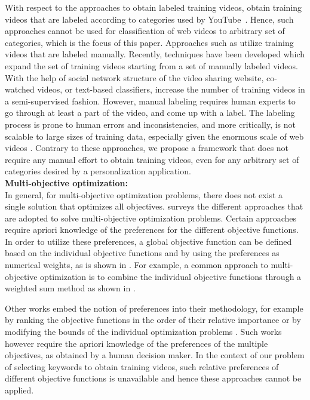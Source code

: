 With respect to the approaches to obtain labeled training videos, \cite{chen2010web,wu2010data,ramachandran2009videomule}   obtain training videos that are labeled according to categories used by YouTube~\cite{Youtube}. Hence, such approaches cannot be used for classification of web videos to arbitrary set of categories, which is the focus of this paper. Approaches such as \cite{schindler2008internet,yang2007multi,song2010taxonomic}  utilize training videos that are labeled manually. Recently, techniques have been developed \cite{wang2010youtubecat,zhang2011improving} which expand the set of training videos starting from a set of manually labeled videos. With the help of social network structure of the video sharing website, co-watched videos, or text-based classifiers, \cite{wang2010youtubecat,zhang2011improving} increase the number of training videos in a semi-supervised fashion. However, manual labeling requires human experts to go through at least a part of the video, and come up with a label. The labeling process is prone to human errors and inconsistencies, and more critically, is not scalable to large sizes of training data, especially given the enormous scale of web videos \cite{Neilson2011}. Contrary to these approaches, we propose a framework that does not require any manual effort to obtain training videos, even for any arbitrary set of categories desired by a personalization application.\\

\noindent \textbf{Multi-objective optimization: } \\
In general, for multi-objective optimization problems, there does not exist a single solution that optimizes all objectives. \cite{Marler04} surveys the different approaches that are adopted to solve multi-objective optimization problems. Certain approaches require apriori knowledge of the preferences for the different objective functions. In order to utilize these preferences, a global objective function can be defined based on the individual objective functions and by using the preferences as numerical weights, as is shown in \cite{Papalambros96,Bridgman22,Koski87}. For example, a common approach to multi-objective optimization is to combine the individual objective functions through a weighted sum method as shown in \cite{Steuer89}. 

Other works embed the notion of preferences into their methodology, for example by ranking the objective functions in the order of their relative importance \cite{YoonHwang95,Hertz94} or by modifying the bounds of the individual optimization problems \cite{HwangMasud79,Haimes71}. Such works however require the apriori knowledge of the preferences of the multiple objectives, as obtained by a human decision maker. 
In the context of our problem of selecting keywords to obtain training videos, such relative preferences of different objective functions is unavailable and hence these approaches cannot be applied. 

